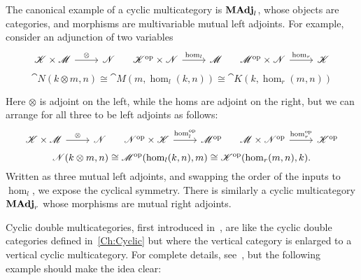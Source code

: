 The canonical example of a cyclic multicategory is $\mathbf{MAdj}_l$, whose objects are categories, and morphisms are multivariable mutual left adjoints. For example, consider an adjunction of two variables
\[
\begin{tikzcd}
	\cat{K}\times \cat{M} \rar{\otimes} & \cat{N}
\end{tikzcd}
\quad
\begin{tikzcd}
	\op{\cat{K}}\times \cat{N} \rar{\hom_l} & \cat{M}
\end{tikzcd}
\quad
\begin{tikzcd}
	\op{\cat{M}}\times \cat{N} \rar{\hom_r} & \cat{K}
\end{tikzcd}
\]
\[
	\cat{N}(k\otimes m,n) \cong \cat{M}(m,\hom_l(k,n)) \cong \cat{K}(k,\hom_r(m,n))
\]

Here $\otimes$ is adjoint on the left, while the homs are adjoint on the right, but we can arrange for all three to be left adjoints as follows:
\[
\begin{tikzcd}
	\cat{K}\times \cat{M} \rar{\otimes} & \cat{N}
\end{tikzcd}
\quad
\begin{tikzcd}
	\op{\cat{N}}\times \cat{K} \rar{\hom_l^{\text{op}}} & \op{\cat{M}}
\end{tikzcd}
\quad
\begin{tikzcd}
	\cat{M}\times \op{\cat{N}} \rar{\hom_r^{\text{op}}} & \op{\cat{K}}
\end{tikzcd}
\]
\[
	\mathscr{N}(k\otimes m,n) \cong {\mathscr{M}}^{\text{op}}(\hom_l(k,n),m) \cong {\mathscr{K}}^{\text{op}}(\hom_r(m,n),k).
\]
Written as three mutual left adjoints, and swapping the order of the inputs to $\hom_l$, we expose the cyclical symmetry. There is similarly a cyclic multicategory $\mathbf{MAdj}_r$ whose morphisms are mutual right adjoints.

Cyclic double multicategories, first introduced in~\cite{cgr:mates}, are like the cyclic double categories defined in~\ref{Ch:Cyclic} but where the vertical category is enlarged to a vertical cyclic multicategory. For complete details, see~\cite{cgr:mates}, but the following example should make the idea clear:


